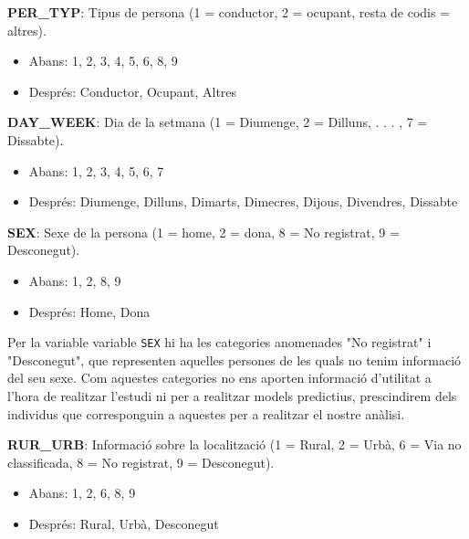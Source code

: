 \documentclass[12pt,longbibliography]{article}
\theoremstyle{definition}
\theoremstyle{remark}
\begin{document}
\textbf{PER\_TYP}: Tipus de persona (1 = conductor, 2 = ocupant, resta de codis = altres).

\begin{itemize}

\item Abans: 1, 2, 3, 4, 5, 6, 8, 9

\item Després: Conductor, Ocupant, Altres

\end{itemize}


\textbf{DAY\_WEEK}: Dia de la setmana (1 = Diumenge, 2 = Dilluns, . . . , 7 = Dissabte).

\begin{itemize}

\item Abans: 1, 2, 3, 4, 5, 6, 7

\item Després: Diumenge, Dilluns, Dimarts, Dimecres, Dijous, Divendres, Dissabte

\end{itemize}

\textbf{SEX}: Sexe de la persona (1 = home, 2 = dona, 8 = No registrat, 9 = Desconegut).

\begin{itemize}

\item Abans: 1, 2, 8, 9

\item Després: Home, Dona

\end{itemize}

Per la variable variable \texttt{SEX} hi ha les categories anomenades "No registrat" i "Desconegut", que representen aquelles persones de les quals no tenim informació del seu sexe. Com aquestes categories no ens aporten informació d'utilitat a l'hora de realitzar l'estudi ni per a realitzar models predictius, prescindirem dels individus que corresponguin a aquestes per a realitzar el nostre anàlisi.

\textbf{RUR\_URB}: Informació sobre la localització (1 = Rural, 2 = Urbà, 6 = Via no classificada, 8 = No registrat, 9 = Desconegut). 

\begin{itemize}

\item Abans: 1, 2, 6, 8, 9

\item Després: Rural, Urbà, Desconegut

\end{itemize}
\end{document}
